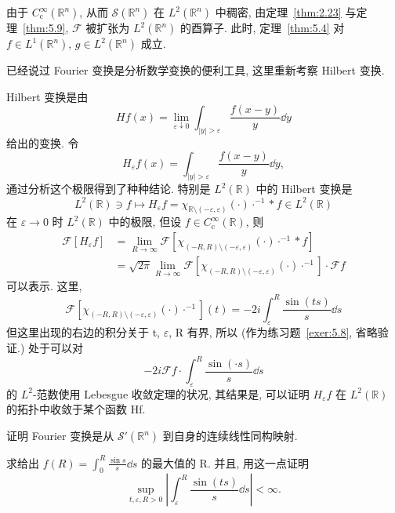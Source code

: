 由于 $C_{\mathrm{c}}^{\infty}(\mathbb{R}^{n})$, 从而 $\mathcal{S}(\mathbb{R}^{n})$ 在 $L^{2}(\mathbb{R}^{n})$ 中稠密, 由定理~\ref{thm:2.23} 与定理~\ref{thm:5.9}, $\mathcal{F}$ 被扩张为 $L^{2}(\mathbb{R}^{n})$ 的酉算子. 此时, 定理~\ref{thm:5.4} 对 $f \in L^{1}(\mathbb{R}^{n})$, $g \in L^{2}(\mathbb{R}^{n})$ 成立.

已经说过 Fourier 变换是分析数学变换的便利工具, 这里重新考察 Hilbert 变换.

\begin{example}\label{exa:5.12}
Hilbert 变换是由
\[
Hf(x) = \lim_{\varepsilon \downarrow 0}\int_{|y| > \varepsilon}\frac{f(x-y)}{y}\dd y
\]
给出的变换. 令
\[
H_{\varepsilon}f(x) = \int_{|y| > \varepsilon}\frac{f(x-y)}{y}\dd y,
\]
通过分析这个极限得到了种种结论. 特别是 $L^{2}(\mathbb{R})$ 中的 Hilbert 变换是
\[
L^{2}(\mathbb{R}) \ni f \mapsto H_{\varepsilon}f = \chi_{\mathbb{R}\setminus(-\varepsilon, \varepsilon)}(\cdot)\cdot^{-1} * f \in L^{2}(\mathbb{R})
\]
在 $\varepsilon \to 0$ 时 $L^{2}(\mathbb{R})$ 中的极限, 但设 $f \in C_{\mathrm{c}}^{\infty}(\mathbb{R})$, 则
\begin{align*}
\mathcal{F}[H_{\varepsilon}f] &= \lim_{R \to \infty}\mathcal{F}[\chi_{(-R,R)\setminus(-\varepsilon, \varepsilon)}(\cdot)\cdot^{-1} * f] \\
&= \sqrt{2\pi}\lim_{R \to \infty}\mathcal{F}[\chi_{(-R,R)\setminus(-\varepsilon, \varepsilon)}(\cdot)\cdot^{-1}] \cdot \mathcal{F}f
\end{align*}
可以表示. 这里,
\[
\mathcal{F}[\chi_{(-R,R)\setminus(-\varepsilon, \varepsilon)}(\cdot)\cdot^{-1}](t) = -2i\int_{\varepsilon}^{R}\frac{\sin(ts)}{s}\dd s
\]
但这里出现的右边的积分关于 t, $\varepsilon$, R 有界, 所以 (作为练习题~\ref{exer:5.8}, 省略验证.) 处于可以对
\[
-2i\mathcal{F}f \cdot \int_{\varepsilon}^{R}\frac{\sin(\cdot s)}{s}\dd s
\]
的 $L^{2}$-范数使用 Lebesgue 收敛定理的状况, 其结果是, 可以证明 $H_{\varepsilon}f$ 在 $L^{2}(\mathbb{R})$ 的拓扑中收敛于某个函数 Hf.
\end{example}

\begin{exercise}\label{exer:5.7}
证明 Fourier 变换是从 $\mathcal{S}'(\mathbb{R}^{n})$ 到自身的连续线性同构映射.
\end{exercise}

\begin{exercise}\label{exer:5.8}
求给出 $f(R) = \int_{0}^{R}\frac{\sin s}{s}\dd s$ 的最大值的 R. 并且, 用这一点证明
\[
\sup_{t, \varepsilon, R > 0}\left|\int_{\varepsilon}^{R}\frac{\sin(ts)}{s}\dd s\right| < \infty.
\]
\end{exercise}

